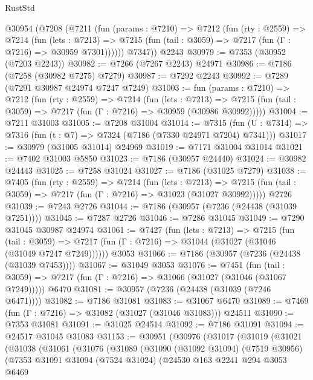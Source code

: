 \begin{lexlean}{RustStd}
\begin{coremodule}
    @30954
      (@7208
        (@7211
          (fun (params : @7210) =>
          @7212
            (fun (rty : @2559) =>
            @7214
              (fun (lets : @7213) =>
              @7215 (fun (tail : @3059) => @7217 (fun (Γ : @7216) => @30959 @7301))))))
        @7347))
    @2243
@30979 := @7353 (@30952 (@7203 @2243))
@30982 := @7266 (@7267 @2243) @24971
@30986 := @7186 (@7258 (@30982 @7275) @7279)
@30987 := @7292 @2243
@30992 := @7289 (@7291 @30987 @24974 @7247 @7249)
@31003 := fun (params : @7210) =>
  @7212
    (fun (rty : @2559) =>
    @7214
      (fun (lets : @7213) =>
      @7215 (fun (tail : @3059) => @7217 (fun (Γ : @7216) => @30959 (@30986 @30992)))))
@31004 := @7211 @31003
@31005 := @7208 @31004
@31014 := @7315
    (fun (U : @7314) => @7316 (fun (t : @7) => @7324 (@7186 (@7330 @24971 @7204) @7341)))
@31017 := @30979 (@31005 @31014) @24969
@31019 := @7171 @31004 @31014
@31021 := @7402 @31003 @5850
@31023 := @7186 (@30957 @24440)
@31024 := @30982 @24443
@31025 := @7258 @31024
@31027 := @7186 (@31025 @7279)
@31038 := @7405
    (fun (rty : @2559) =>
    @7214
      (fun (lets : @7213) =>
      @7215 (fun (tail : @3059) => @7217 (fun (Γ : @7216) => @31023 (@31027 @30992)))))
    @2726
@31039 := @7243 @2726
@31044 := @7186 (@30957 (@7236 (@24438 (@31039 @7251))))
@31045 := @7287 @2726
@31046 := @7286 @31045
@31049 := @7290 @31045 @30987 @24974
@31061 := @7427
    (fun (lets : @7213) =>
    @7215
      (fun (tail : @3059) =>
      @7217 (fun (Γ : @7216) => @31044 (@31027 (@31046 (@31049 @7247 @7249))))))
    @3053
@31066 := @7186 (@30957 (@7236 (@24438 (@31039 @7453))))
@31067 := @31049 @3053
@31076 := @7451
    (fun (tail : @3059) => @7217 (fun (Γ : @7216) => @31066 (@31027 (@31046 (@31067 @7249)))))
    @6470
@31081 := @30957 (@7236 (@24438 (@31039 (@7246 @6471))))
@31082 := @7186 @31081
@31083 := @31067 @6470
@31089 := @7469 (fun (Γ : @7216) => @31082 (@31027 (@31046 @31083))) @24511
@31090 := @7353 @31081
@31091 := @31025 @24514
@31092 := @7186 @31091
@31094 := @24517 @31045 @31083
@31153 := @30951
    (@30976
      (@31017
        (@31019
          (@31021
            (@31038
              (@31061
                (@31076
                  (@31089
                    (@31090
                      (@31092 @31094)
                      (@7519 @30956)
                      (@7353
                        @31091
                        @31094
                        (@7524 @31024)
                        (@24530
                          @163
                          @2241
                          @294
                          @3053
                          @6469

\end{coremodule}
\end{lexlean}
